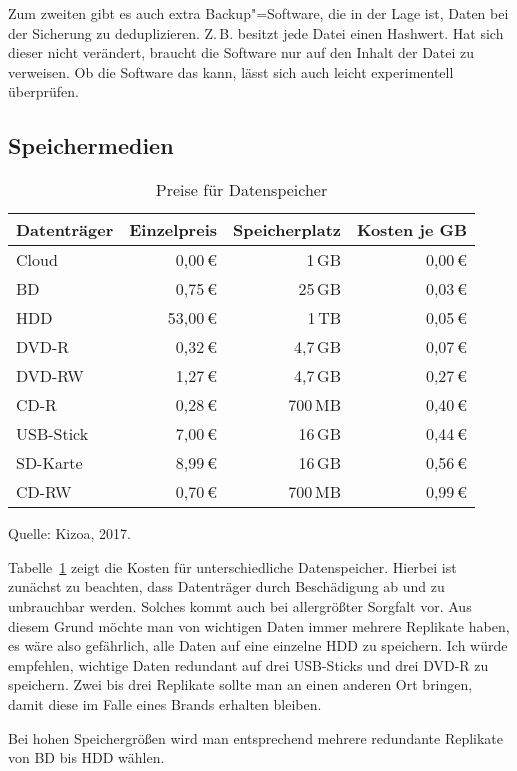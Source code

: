 \documentclass[a4paper,11pt,fleqn,twocolumn,twoside]{scrartcl}
\newcommand{\strong}[1]{\textsf{\textbf{#1}}}
\newcommand{\smallstrong}[1]{{\footnotesize\strong{#1}}}
\begin{document}
Zum zweiten gibt es auch extra Backup"=Software, die in der Lage ist,
Daten bei der Sicherung zu deduplizieren. Z.\,B. besitzt jede
Datei einen Hashwert. Hat sich dieser nicht verändert, braucht die
Software nur auf den Inhalt der Datei zu verweisen. Ob die Software
das kann, lässt sich auch leicht experimentell überprüfen.

\subsection{Speichermedien}

\begin{table}
\begin{tabular}{@{}lrrr@{}}
\toprule
\smallstrong{Datenträger} & \smallstrong{Einzelpreis}
& \smallstrong{Speicherplatz} & \smallstrong{Kosten je GB}\\
\midrule
Cloud    &  0,00\,€ &  1\,GB & 0,00\,€\\ 
BD       &  0,75\,€ & 25\,GB & 0,03\,€\\
HDD      & 53,00\,€ &  1\,TB & 0,05\,€\\
\midrule
DVD-R    &  0,32\,€ &4,7\,GB & 0,07\,€\\
DVD-RW   &  1,27\,€ &4,7\,GB & 0,27\,€\\
CD-R     &  0,28\,€ &700\,MB & 0,40\,€\\
\midrule
USB-Stick&  7,00\,€ & 16\,GB & 0,44\,€\\
SD-Karte &  8,99\,€ & 16\,GB & 0,56\,€\\
CD-RW    &  0,70\,€ &700\,MB & 0,99\,€\\
\bottomrule
\end{tabular}
\caption{Preise für Datenspeicher}\label{Datenspeicher}
Quelle: Kizoa, 2017.
\end{table}

Tabelle~\ref{Datenspeicher} zeigt die Kosten für unterschiedliche
Datenspeicher. Hierbei ist zunächst zu beachten, dass Datenträger
durch Beschädigung ab und zu unbrauchbar werden. Solches kommt auch
bei allergrößter Sorgfalt vor. Aus diesem Grund möchte man von
wichtigen Daten immer mehrere Replikate haben, es wäre also gefährlich,
alle Daten auf eine einzelne HDD zu speichern. Ich würde empfehlen,
wichtige Daten redundant auf drei USB-Sticks und drei DVD-R zu
speichern. Zwei bis drei Replikate sollte man an einen anderen
Ort bringen, damit diese im Falle eines Brands erhalten bleiben.

Bei hohen Speichergrößen wird man entsprechend mehrere
redundante Replikate von BD bis HDD wählen.
\end{document}
